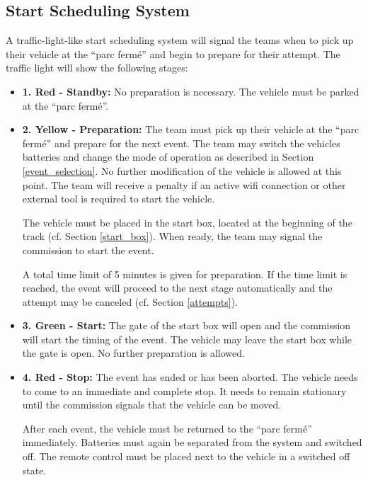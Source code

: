 \subsection{Start Scheduling System}
\label{start_scheduling}

A traffic-light-like start scheduling system will signal the teams when to pick up their vehicle at the “parc fermé” and begin to prepare for their attempt.
The traffic light will show the following stages:

\begin{itemize}
	\item \textbf{1. Red - Standby:} \newline
	      No preparation is necessary.
	      The vehicle must be parked at the “parc fermé”.

	\item \textbf{2. Yellow - Preparation:} \newline
	      The team must pick up their vehicle at the “parc fermé” and prepare for the next event.
	      The team may switch the vehicles batteries and change the mode of operation as described in Section \ref{event_selection}.
	      No further modification of the vehicle is allowed at this point.
	      The team will receive a penalty if an active wifi connection or other external tool is required to start the vehicle.

	      The vehicle must be placed in the start box, located at the beginning of the track (cf. Section \ref{start_box}).
	      When ready, the team may signal the commission to start the event.

	      A total time limit of 5 minutes is given for preparation.
	      If the time limit is reached, the event will proceed to the next stage automatically and the attempt may be canceled (cf. Section \ref{attempts}).

	\item \textbf{3. Green - Start:} \newline
	      The gate of the start box will open and the commission will start the timing of the event.
	      The vehicle may leave the start box while the gate is open.
	      No further preparation is allowed.

	\item \textbf{4. Red - Stop:} \newline
	      The event has ended or has been aborted.
	      The vehicle needs to come to an immediate and complete stop.
		  It needs to remain stationary until the commission signals that the vehicle can be moved.

	      After each event, the vehicle must be returned to the “parc fermé” immediately.
	      Batteries must again be separated from the system and switched off.
	      The remote control must be placed next to the vehicle in a switched off state.

\end{itemize}

